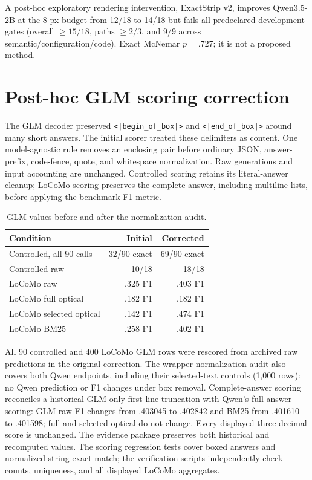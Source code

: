 \documentclass{article}
\begin{document}
A post-hoc exploratory rendering intervention, ExactStrip v2, improves Qwen3.5-2B at the 8 px budget from 12/18 to 14/18 but fails all predeclared development gates (overall $\geq15/18$, paths $\geq2/3$, and 9/9 across semantic/configuration/code). Exact McNemar $p=.727$; it is not a proposed method.

\section{Post-hoc GLM scoring correction}
\label{app:scoring}

The GLM decoder preserved \texttt{<|begin\_of\_box|>} and \texttt{<|end\_of\_box|>} around many short answers. The initial scorer treated these delimiters as content. One model-agnostic rule removes an enclosing pair before ordinary JSON, answer-prefix, code-fence, quote, and whitespace normalization. Raw generations and input accounting are unchanged. Controlled scoring retains its literal-answer cleanup; LoCoMo scoring preserves the complete answer, including multiline lists, before applying the benchmark F1 metric.

\begin{table}[h]
  \caption{GLM values before and after the normalization audit.}
  \centering
  \small
  \begin{tabular}{lrr}
    \toprule
    Condition & Initial & Corrected \\
    \midrule
    Controlled, all 90 calls & 32/90 exact & 69/90 exact \\
    Controlled raw & 10/18 & 18/18 \\
    LoCoMo raw & .325 F1 & .403 F1 \\
    LoCoMo full optical & .182 F1 & .182 F1 \\
    LoCoMo selected optical & .142 F1 & .474 F1 \\
    LoCoMo BM25 & .258 F1 & .402 F1 \\
    \bottomrule
  \end{tabular}
\end{table}

All 90 controlled and 400 LoCoMo GLM rows were rescored from archived raw predictions in the original correction. The wrapper-normalization audit also covers both Qwen endpoints, including their selected-text controls (1,000 rows): no Qwen prediction or F1 changes under box removal. Complete-answer scoring reconciles a historical GLM-only first-line truncation with Qwen's full-answer scoring: GLM raw F1 changes from .403045 to .402842 and BM25 from .401610 to .401598; full and selected optical do not change. Every displayed three-decimal score is unchanged. The evidence package preserves both historical and recomputed values. The scoring regression tests cover boxed answers and normalized-string exact match; the verification scripts independently check counts, uniqueness, and all displayed LoCoMo aggregates.
\end{document}
